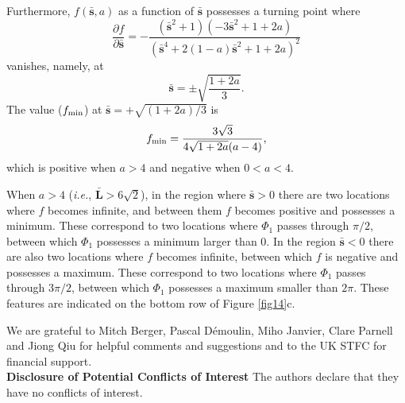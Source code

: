 \documentclass[10pt,namedreferneces]{SolarPhysics}
\begin{document}
\begin{article}
Furthermore, $f({\bm\bar s},a)$ as a function of ${\bm\bar s}$ possesses a turning point where
\begin{equation}
\frac{\partial f}{\partial {\bm\bar s}}=-\frac{({\bm\bar s}^2+1)(-3{\bm\bar s}^2+1+2a)}{({\bm\bar s}^4+2(1-a){\bm\bar s}^2+1+2a)^2}
\label{app6}
\end{equation}
vanishes, namely, at 
\begin{equation}
{\bm\bar s}=\pm\sqrt{\frac{1+2a}{3}}.
\label{app7}
\end{equation}
 The value ($f_{\rm min}$) at ${\bm\bar s}=+\sqrt{(1+2a)/3}$ is 
\begin{equation}
f_{\rm min}=\frac{3\sqrt3}{4\sqrt{1+2a}(a-4)},
\label{app8}
\end{equation}
which is positive when $a>4$ and negative when $0<a<4$.

When $a>4$ (\textit{i.e.}, ${\bm\bar L}>6\sqrt 2$), in the region where ${\bm\bar s}>0$ there are two locations where $f$ becomes infinite, and between them $f$ becomes positive and possesses a minimum. These correspond to two locations where $\Phi_1$ passes through $\pi/2$, between which $\Phi_1$ possesses a minimum larger than 0. In the region ${\bm\bar s}<0$ there are also two locations where $f$ becomes infinite, between which $f$ is negative and possesses a maximum. These correspond to two locations where $\Phi_1$ passes through $3\pi/2$, between which $\Phi_1$ possesses a maximum smaller than $2\pi$.  These features are indicated on the bottom row of Figure \ref{fig14}c.

\acknowledgements
We are grateful to Mitch Berger, Pascal D{\' e}moulin, Miho Janvier, Clare Parnell and Jiong Qiu for helpful comments and suggestions and to the UK STFC for financial support.\\

\setlength{\parindent}{0cm}
{\bf Disclosure of Potential Conflicts of Interest}
 The authors declare that they have no conflicts of interest.


%
%
% 
%  


\end{article}
\end{document}
